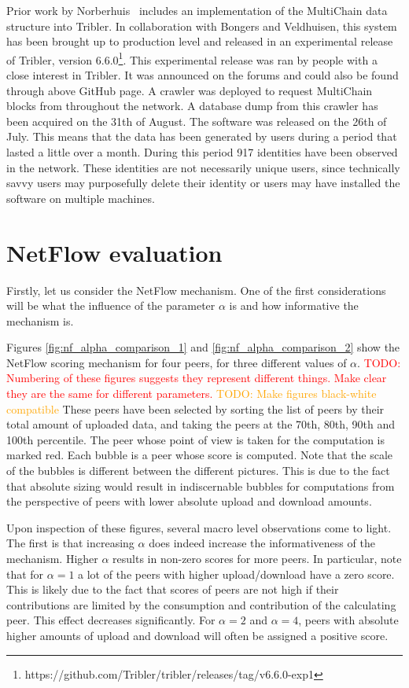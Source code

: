 \documentclass[a4paper,11pt]{book}
\newcommand\musthave[1]{\textcolor{red}{TODO: #1}}
\newcommand\nicetohave[1]{\textcolor{orange}{TODO: #1}}
\theoremstyle{definition}
\begin{document}
Prior work by Norberhuis~\cite{norberhuis2015multichain} includes
an implementation of the MultiChain data structure into Tribler. In collaboration with Bongers and Veldhuisen,
this system has been brought up to production level and released in an experimental release of Tribler,
version 6.6.0\footnote{https://github.com/Tribler/tribler/releases/tag/v6.6.0-exp1}. This experimental
release was ran by people with a close interest in Tribler. It was announced on the forums and could
also be found through above GitHub page. A crawler was deployed to request MultiChain blocks from throughout
the network. A database dump from this crawler has been acquired on the 31th of August. The software
was released on the 26th of July. This means that the data has been generated by users during a period
that lasted a little over a month. During this period 917 identities have been observed in the network.
These identities are not necessarily unique users, since technically savvy users may purposefully 
delete their identity or users may have installed the software on multiple machines.

\section{NetFlow evaluation}

Firstly, let us consider the NetFlow mechanism. One of the first considerations will be what the influence
of the parameter $\alpha$ is and how informative the mechanism is.

Figures \ref{fig:nf_alpha_comparison_1} and \ref{fig:nf_alpha_comparison_2}
show the NetFlow scoring mechanism for four peers, for three
different values of $\alpha$. 
\musthave{Numbering of these figures suggests they represent different things. Make clear they are the
same for different parameters. } 
\nicetohave{Make figures black-white compatible}
These peers have been selected by sorting the list of peers by their total
amount of uploaded data, and taking the peers at the 70th, 80th, 90th and 100th percentile.
The peer whose point of view is taken for the computation is marked red. Each bubble is a peer whose
score is computed. Note that the scale of the bubbles is different between the different pictures. 
This is due to the fact that absolute sizing would result in indiscernable bubbles for computations
from the perspective of peers with lower absolute upload and download amounts. 

Upon inspection of these figures, several macro level observations come to light. The first
is that increasing $\alpha$ does indeed increase the informativeness of the mechanism.
Higher $\alpha$ results in non-zero scores for more peers. In particular, note that
for $\alpha=1$ a lot of the peers with higher upload/download have a zero score. This is
likely due to the fact that scores of peers are not high if their contributions are limited
by the consumption and contribution of the calculating peer. This effect decreases
significantly. For $\alpha=2$ and $\alpha=4$, peers with absolute higher amounts of upload
and download will often be assigned a positive score. 
\end{document}
